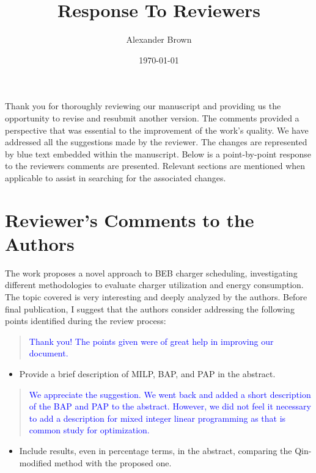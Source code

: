 \documentclass[11pt,a4paper,final]{article}
\author{Alexander Brown}
\date{\today}
\title{Response To Reviewers}
\begin{document}
\maketitle

Thank you for thoroughly reviewing our manuscript and providing us the opportunity to revise and resubmit another
version. The comments provided a perspective that was essential to the improvement of the work's
quality. We have addressed all the suggestions made by the reviewer. The changes are represented by blue text
embedded within the manuscript. Below is a point-by-point response to the reviewers comments are presented. Relevant
sections are mentioned when applicable to assist in searching for the associated changes.

\section{Reviewer's Comments to the Authors}
The work proposes a novel approach to BEB charger scheduling, investigating different methodologies to evaluate charger utilization and energy consumption. The topic covered is very interesting and deeply analyzed by the authors.
Before final publication, I suggest that the authors consider addressing the following points identified during the review process:

\begin{quote}
  \textcolor{blue}{Thank you! The points given were of great help in improving our document.}
\end{quote}

\begin{itemize}
  \item Provide a brief description of MILP, BAP, and PAP in the abstract.
\end{itemize}

\begin{quote}
  \textcolor{blue}{We appreciate the suggestion. We went back and added a short description of the BAP and PAP to the abstract. However, we did not feel it necessary to add a description for mixed integer linear programming as that is common study for optimization.}
\end{quote}

\begin{itemize}
\item Include results, even in percentage terms, in the abstract, comparing the Qin-modified method with the proposed one.
\end{itemize}
\end{document}
